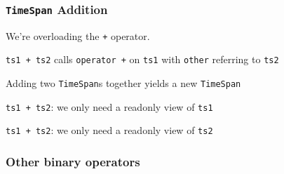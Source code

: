 \begin{frame}
  \frametitle{{\tt TimeSpan} Addition}

  
  \begin{overprint}
    \begin{center}
      We're overloading the {\tt +} operator.
    \end{center}

    \begin{center}
      {\tt ts1 + ts2} calls {\tt operator +} on {\tt ts1} with {\tt other} referring to {\tt ts2}
    \end{center}

    \begin{center}
      Adding two {\tt TimeSpan}s together yields a new {\tt TimeSpan}
    \end{center}

    \begin{center}
      {\tt ts1 + ts2}: we only need a readonly view of {\tt ts1}
    \end{center}

    \begin{center}
      {\tt ts1 + ts2}: we only need a readonly view of {\tt ts2}
    \end{center}
  \end{overprint}
\end{frame}

\begin{frame}
  \frametitle{Other binary operators}
\end{frame}

